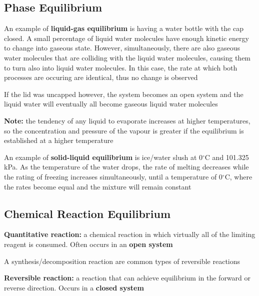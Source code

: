 \subsection{Phase Equilibrium}
\begin{bulleted-list}
    \item An example of \textbf{liquid-gas equilibrium} is having a water bottle with the cap closed. A small
        percentage of liquid water molecules have enough kinetic energy to change into gaseous state.
        However, simultaneously, there are also gaseous water molecules that are colliding with the
        liquid water molecules, causing them to turn also into liquid water molecules. In this case,
        the rate at which both processes are occuring are identical, thus no change is observed
    \item If the lid was uncapped however, the system becomes an open system and the liquid water
        will eventually all become gaseous liquid water molecules
    \item \textbf{Note:} the tendency of any liquid to evaporate increases at higher temperatures,
        so the concentration and pressure of the vapour is greater if the equilibrium is established
        at a higher temperature
    \item An example of \textbf{solid-liquid equilibrium} is ice/water slush at 0$^{\circ}$C and
        101.325 kPa. As the temperature of the water drops, the rate of melting decreases while the
        rating of freezing increases simultaneously, until a temperature of 0$^{\circ}$C, where the
        rates become equal and the mixture will remain constant
\end{bulleted-list}

\subsection{Chemical Reaction Equilibrium}
\begin{bulleted-list}
    \item \textbf{Quantitative reaction:} a chemical reaction in which virtually all of the limiting
        reagent is consumed. Often occurs in an \textbf{open system}
    \item A synthesis/decomposition reaction are common types of reversible reactions
    \item \textbf{Reversible reaction:} a reaction that can achieve equilibrium in the forward
        or reverse direction. Occurs in a \textbf{closed system}
\end{bulleted-list}

